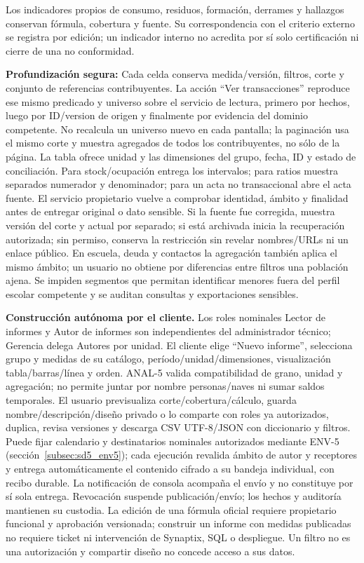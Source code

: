 Los indicadores propios de consumo, residuos, formación, derrames y hallazgos conservan fórmula, cobertura y fuente. Su correspondencia con el criterio externo se registra por edición; un indicador interno no acredita por sí solo certificación ni cierre de una no conformidad.

\label{subsec:sd5_anal5_filtros}
\textbf{Profundización segura:} Cada celda conserva medida/versión, filtros, corte y conjunto de referencias contribuyentes. La acción ``Ver transacciones'' reproduce ese mismo predicado y universo sobre el servicio de lectura, primero por hechos, luego por ID/version de origen y finalmente por evidencia del dominio competente. No recalcula un universo nuevo en cada pantalla; la paginación usa el mismo corte y muestra agregados de todos los contribuyentes, no sólo de la página. La tabla ofrece unidad y las dimensiones del grupo, fecha, ID y estado de conciliación. Para stock/ocupación entrega los intervalos; para ratios muestra separados numerador y denominador; para un acta no transaccional abre el acta fuente. El servicio propietario vuelve a comprobar identidad, ámbito y finalidad antes de entregar original o dato sensible. Si la fuente fue corregida, muestra versión del corte y actual por separado; si está archivada inicia la recuperación autorizada; sin permiso, conserva la restricción sin revelar nombres/URLs ni un enlace público. En escuela, deuda y contactos la agregación también aplica el mismo ámbito; un usuario no obtiene por diferencias entre filtros una población ajena. Se impiden segmentos que permitan identificar menores fuera del perfil escolar competente y se auditan consultas y exportaciones sensibles.

\label{subsec:sd5_anal5_constructor}
\textbf{Construcción autónoma por el cliente.} Los roles nominales Lector de informes y Autor de informes son independientes del administrador técnico; Gerencia delega Autores por unidad. El cliente elige ``Nuevo informe'', selecciona grupo y medidas de su catálogo, período/unidad/dimensiones, visualización tabla/barras/línea y orden. ANAL-5 valida compatibilidad de grano, unidad y agregación; no permite juntar por nombre personas/naves ni sumar saldos temporales. El usuario previsualiza corte/cobertura/cálculo, guarda nombre/descripción/diseño privado o lo comparte con roles ya autorizados, duplica, revisa versiones y descarga CSV UTF-8/JSON con diccionario y filtros. Puede fijar calendario y destinatarios nominales autorizados mediante ENV-5 (sección~\ref{subsec:sd5_env5}); cada ejecución revalida ámbito de autor y receptores y entrega automáticamente el contenido cifrado a su bandeja individual, con recibo durable. La notificación de consola acompaña el envío y no constituye por sí sola entrega. Revocación suspende publicación/envío; los hechos y auditoría mantienen su custodia. La edición de una fórmula oficial requiere propietario funcional y aprobación versionada; construir un informe con medidas publicadas no requiere ticket ni intervención de Synaptix, SQL o despliegue. Un filtro no es una autorización y compartir diseño no concede acceso a sus datos.

